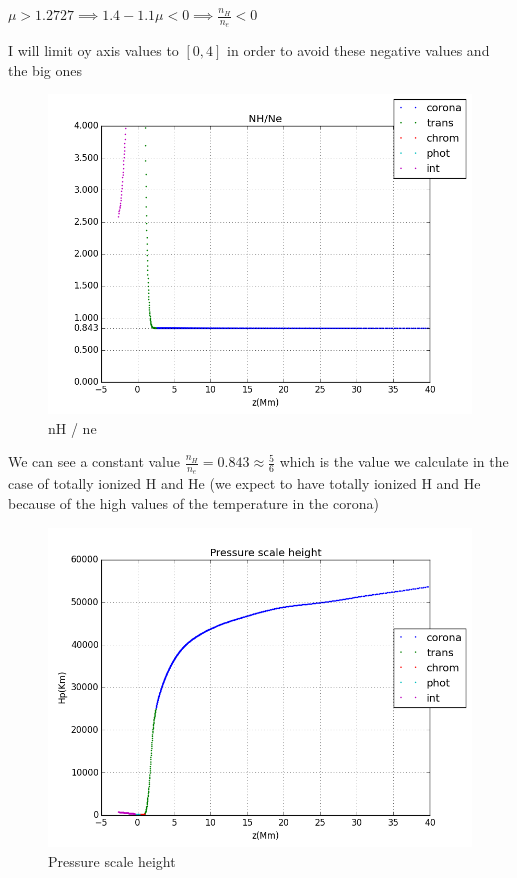 \documentclass[10pt]{book}
\begin{document}
$\mu > 1.2727 \implies 1.4 - 1.1 \mu < 0 \implies \frac{n_H}{n_e} < 0$

I will limit oy axis values to $ [0,4]$ in order to avoid these negative values and the big ones 


\begin{figure}[H]
 \centering
 \includegraphics[scale=0.5]{nHDivNe.png}
 \caption{nH / ne }
\end{figure}

We can see a constant value  $\frac{n_H}{n_e}  = 0.843 \approx  \frac{5}{6}$ 
which is the value we calculate in the case of totally ionized H and He (we expect to have totally ionized H and He because of 
the high values of the temperature in the corona)



\begin{figure}[H]
 \centering
 \includegraphics[scale=0.5]{hpLayers.png}
 \caption{Pressure scale height}
\end{figure}
\end{document}

